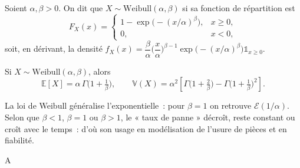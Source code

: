 \medskip

\begin{mdframed}
\begin{definition}
Soient $\alpha,\beta>0$. On dit que $X\sim\mathrm{Weibull}(\alpha,\beta)$ si sa fonction de
répartition est
\[
  F_X(x)=
  \begin{cases}
    1-\exp\!\big(-(x/\alpha)^\beta\big), & x\ge0,\\[2pt]
    0, & x<0,
  \end{cases}
\]
soit, en dérivant, la densité
$f_X(x)=\dfrac\beta\alpha\Big(\dfrac x\alpha\Big)^{\beta-1}
\exp\!\big(-(x/\alpha)^\beta\big)\mathbb{1}_{x\ge0}$.
\end{definition}
\end{mdframed}

\medskip

\begin{mdframed}
\begin{proposition}
Si $X\sim\mathrm{Weibull}(\alpha,\beta)$, alors
\[
  \mathbb{E}[X]=\alpha\,\Gamma\!\Big(1+\tfrac1\beta\Big),\qquad
  \mathbb{V}(X)=\alpha^2\!\left[\Gamma\!\Big(1+\tfrac2\beta\Big)
  -\Gamma\!\Big(1+\tfrac1\beta\Big)^2\right].
\]
\end{proposition}
\end{mdframed}

\begin{remarque}
La loi de Weibull généralise l'exponentielle~: pour $\beta=1$ on retrouve
$\mathcal{E}(1/\alpha)$. Selon que $\beta<1$, $\beta=1$ ou $\beta>1$, le « taux de
panne » décroît, reste constant ou croît avec le temps~: d'où son usage en
modélisation de l'usure de pièces et en fiabilité.
\end{remarque}



\begin{mdframed}
A
\end{mdframed}